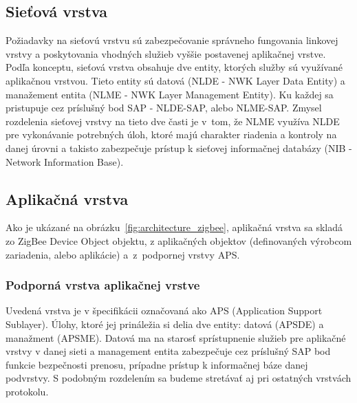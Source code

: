 \subsection{Sieťová vrstva}
\indent\indent Požiadavky na sieťovú vrstvu sú zabezpečovanie správneho fungovania linkovej vrstvy a poskytovania vhodných služieb vyššie postavenej aplikačnej vrstve. Podľa konceptu, sieťová vrstva obsahuje dve entity, ktorých služby sú využívané aplikačnou vrstvou. Tie\-to entity sú datová (NLDE - NWK Layer Data Entity) a manažement entita (NLME - NWK Layer Management Entity). Ku každej sa pristupuje cez príslušný bod SAP - NLDE-SAP, alebo NLME-SAP. Zmysel rozdelenia sieťovej vrstvy na tieto dve časti je v~tom, že NLME využíva NLDE pre vykonávanie potrebných úloh, ktoré majú charakter riadenia a kontroly na danej úrovni a takisto zabezpečuje prístup k sieťovej informačnej databázy (NIB - Network Information Base).\\
\subsection{Aplikačná vrstva}
\indent\indent Ako je ukázané na obrázku~\ref{fig:architecture_zigbee}, aplikačná vrstva sa skladá zo ZigBee Device Object objektu, z aplikačných objektov (definovaných výrobcom zariadenia, alebo aplikácie) a~z~podpornej vrstvy APS.\\
\subsubsection{Podporná vrstva aplikačnej vrstve}
\indent\indent Uvedená vrstva je v špecifikácii označovaná ako APS (Application Support Sub\-layer). Úlohy, ktoré jej prináležia si delia dve entity: datová (APSDE) a manažment (APSME). Datová ma na starosť sprístupnenie služieb pre aplikačné vrstvy v danej sieti a management entita zabezpečuje cez príslušný SAP bod funkcie bezpečnosti prenosu, prípadne prístup k informačnej báze danej podvrstvy. S podobným rozdelením sa budeme stretávať aj pri ostatných vrstvách protokolu.\\
